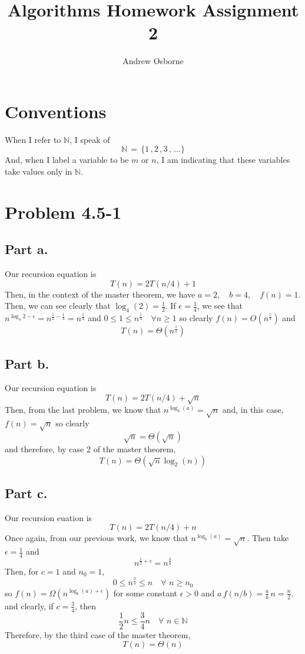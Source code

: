 \documentclass{article}
\title{Algorithms Homework Assignment 2}
\author{Andrew Osborne}
\begin{document}
  \maketitle

  \section*{Conventions}
  When I refer to $\mathbb{N}$, I speak of $$\mathbb{N} \, = \, \{ 1\,,2\,,3\,,\,\dots \}$$
  And, when I label a variable to be $m$ or $n$, I am indicating that these variables take values only in $\mathbb{N}$.

  \section*{Problem 4.5-1}
    \subsection*{Part a.}

      Our recursion equation is $$T(n) = 2T(n/4) + 1$$
      Then, in the context of the master theorem, we have
      $ a = 2, \quad b = 4,\quad f(n) = 1 $.
      Then, we can see clearly that $\log_{4}(2) = \frac{1}{2}$.
      If $\epsilon = \frac{1}{4}$, we see that $n^{\log_4{2} - \epsilon} = n^{\frac{1}{2} - \frac{1}{4}} = n^{\frac{1}{4}}$ and $ 0 \leq 1 \leq n^{\frac{1}{4}} \quad \forall n \geq 1$ so clearly
      $f(n) = O(n^{\frac{1}{4}})$ and $$T(n) = \Theta(n^{\frac{1}{2}})$$

    \subsection*{Part b.}
      Our recursion equation is $$ T(n) = 2T(n/4) + \sqrt{n}$$
      Then, from the last problem, we know that $n^{\log_b(a)} = \sqrt{n}$ and,
      in this case, $f(n) = \sqrt{n}$ so clearly
      $$ \sqrt{n} = \Theta(\sqrt{n}) $$
      and therefore, by case 2 of the master theorem, $$ T(n) = \Theta(\sqrt{n} \log_{2}(n)) $$

    \subsection*{Part c.}
      Our recursion euation is $$T(n) = 2T(n/4) + n $$
      Once again, from our previous work, we know that $n^{\log_b(a)} = \sqrt{n}$.
      Then take $\epsilon = \frac{1}{4}$ and $$n^{\frac{1}{2} + \epsilon} = n^{\frac{3}{4}} $$
      Then, for $ c =1$ and $n_0 = 1$,
      $$ 0 \leq n^{\frac{3}{4}} \leq n \quad \forall \,\, n \geq n_0$$
      so $f(n) = \Omega(n^{\log_b(a) + \epsilon})$ for some constant $\epsilon > 0 $ and $ a\,f(n/b) = \frac{a}{b} \, n = \frac{n}{2}$.
      and clearly, if $c = \frac{3}{4}$, then
      $$ \frac{1}{2} n \leq \frac{3}{4}n \quad \forall \,\, n \in \mathbb{N} $$
      Therefore, by the third case of the master theorem,
      $$T(n) = \Theta(n) $$
\end{document}
